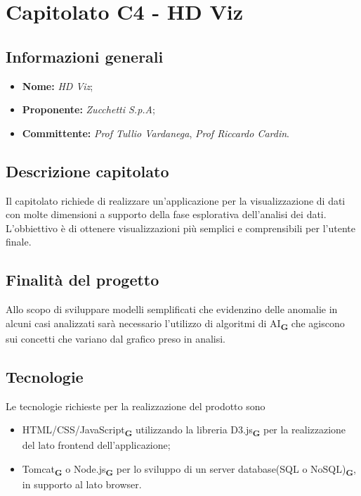 \section{Capitolato C4 - HD Viz}

\subsection{Informazioni generali}

\begin{itemize}
    \item \textbf{Nome:} \textit{HD Viz};
    \item \textbf{Proponente:} \textit{Zucchetti S.p.A};
    \item \textbf{Committente:} \emph{Prof Tullio Vardanega}, \emph{Prof Riccardo Cardin}.
\end{itemize}

\subsection{Descrizione capitolato}
Il capitolato richiede di realizzare un'applicazione per la
visualizzazione di dati con molte dimensioni a supporto della fase esplorativa
dell'analisi dei dati. L'obbiettivo è di ottenere visualizzazioni più semplici e comprensibili per l'utente finale.

\subsection{Finalità del progetto}
Allo scopo di sviluppare modelli semplificati che evidenzino delle anomalie in alcuni casi analizzati sarà necessario l'utilizzo di algoritmi di AI\textsubscript{\textbf{G}} che agiscono sui concetti che variano dal grafico preso in analisi.

\subsection{Tecnologie}
Le tecnologie richieste per la realizzazione del prodotto sono
\begin{itemize}
    \item HTML/CSS/JavaScript\textsubscript{\textbf{G}} utilizzando la libreria D3.js\textsubscript{\textbf{G}} per la realizzazione del lato frontend dell'applicazione;
    \item Tomcat\textsubscript{\textbf{G}} o Node.js\textsubscript{\textbf{G}} per lo sviluppo di un server database(SQL o NoSQL)\textsubscript{\textbf{G}}, in supporto al lato browser.
\end{itemize}

